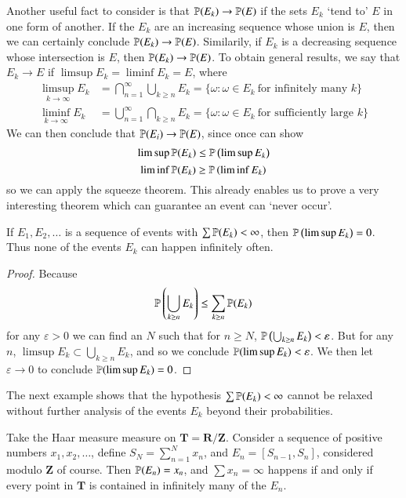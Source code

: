 Another useful fact to consider is that $\mathbb{P}(E_k) \to \mathbb{P}(E)$ if the sets $E_k$ `tend to' $E$ in one form of another. If the $E_k$ are an increasing sequence whose union is $E$, then we can certainly conclude $\mathbb{P}(E_k) \to \mathbb{P}(E)$. Similarily, if $E_k$ is a decreasing sequence whose intersection is $E$, then $\mathbb{P}(E_k) \to \mathbb{P}(E)$. To obtain general results, we say that $E_k \to E$ if $\limsup E_k = \liminf E_k = E$, where
%
\begin{align*}
    \limsup_{k \to \infty} E_k &= \bigcap_{n = 1}^\infty \bigcup_{k \geq n} E_k = \{ \omega : \omega \in E_k\ \text{for infinitely many $k$} \}\\
    \liminf_{k \to \infty} E_k &= \bigcup_{n = 1}^\infty \bigcap_{k \geq n} E_k = \{ \omega: \omega \in E_k\ \text{for sufficiently large $k$} \}
\end{align*}
%
We can then conclude that $\mathbb{P}(E_i) \to \mathbb{P}(E)$, since once can show
%
\[ \limsup \mathbb{P}(E_k) \leq \mathbb{P} \left( \limsup E_k \right) \]
\[ \liminf \mathbb{P}(E_k) \geq \mathbb{P} \left( \liminf E_k \right) \]
%
so we can apply the squeeze theorem. This already enables us to prove a very interesting theorem which can guarantee an event can `never occur'.

\begin{lemma}
    If $E_1, E_2, \dots$ is a sequence of events with $\sum \mathbb{P}(E_k) < \infty$, then $\operatorname{\mathbb{P}} \left( \limsup E_k \right) = 0$. Thus none of the events $E_k$ can happen infinitely often.
\end{lemma}
\begin{proof}
    Because
    \[ \mathbb{P} \left( \bigcup_{k \geq n} E_k \right) \leq \sum_{k \geq n} \mathbb{P}(E_k) \]
    for any $\varepsilon > 0$ we can find an $N$ such that for $n \geq N$, $\mathbb{P} \left( \bigcup_{k \geq n} E_k \right) < \varepsilon$. But for any $n$, $\limsup E_k \subset \bigcup_{k \geq n} E_k$, and so we conclude $\mathbb{P}(\limsup E_k) < \varepsilon$. We then let $\varepsilon \to 0$ to conclude $\mathbb{P}(\limsup E_k) = 0$.
\end{proof}

The next example shows that the hypothesis $\sum \mathbb{P}(E_k) < \infty$ cannot be relaxed without further analysis of the events $E_k$ beyond their probabilities.

\begin{example}
    Take the Haar measure measure on $\mathbf{T} = \mathbf{R}/\mathbf{Z}$. Consider a sequence of positive numbers $x_1, x_2, \dots$, define $S_N = \sum_{n = 1}^N x_n$, and $E_n = [S_{n-1},S_n]$, considered modulo $\mathbf{Z}$ of course. Then $\operatorname{\mathbb{P}}(E_n) = x_n$, and $\sum x_n = \infty$ happens if and only if every point in $\mathbf{T}$ is contained in infinitely many of the $E_n$.
\end{example}

